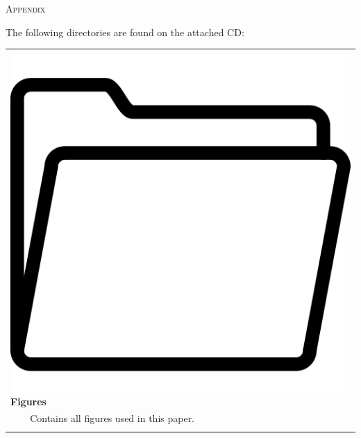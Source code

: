 \null\vspace*{\fill}
\begin{center}
  {\fontsize{.1\textheight}{5em}\selectfont\textsc{Appendix}}
\end{center}
\vspace*{\fill}
\clearpage

\label{cha:appendix}

The following directories are found on the attached CD:
\begin{table}[ht]
  \renewcommand{\arraystretch}{1.5}
  \begin{tabularx}{\textwidth}{llX}
    \multicolumn{3}{l}{ \includegraphics[height=.014\textheight]{Figures/icon_folder.png} \textbf{Figures}}               \\ 
    \hspace{.066\textwidth}   & \multicolumn{2}{l}{Contains all figures used in this paper.}                     \\
                  &             &                                         \\

\end{tabularx}
\end{table}
